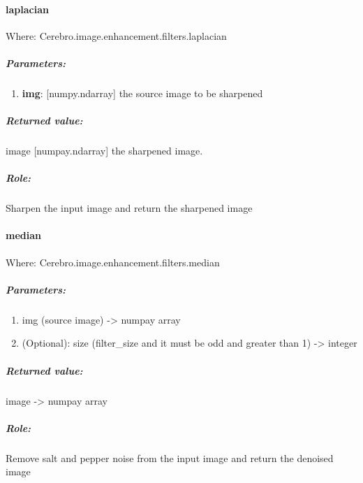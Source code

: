 \paragraph{laplacian}
Where: Cerebro.image.enhancement.filters.laplacian
\subparagraph{Parameters:}
\begin{changemargin}{0.5cm}{0cm}
\begin{enumerate} 
	\item \textbf{img}: [numpy.ndarray] the source image to be sharpened
\end{enumerate}
\end{changemargin}

\subparagraph{Returned value:}
\begin{changemargin}{1cm}{0cm}
	image [numpay.ndarray] the sharpened image.
\end{changemargin}

\subparagraph{Role:}
\begin{changemargin}{1cm}{0cm}
	Sharpen the input image and return the sharpened image
\end{changemargin}

\paragraph{median}
Where: Cerebro.image.enhancement.filters.median \newline
\subparagraph{Parameters:}
\begin{changemargin}{0.5cm}{0cm}
	\begin{enumerate}
		\item img (source image) -> numpay array \newline
		\item (Optional): size (filter\_size and it must be odd and greater than 1) -> integer \newline
	\end{enumerate}
\end{changemargin}

\subparagraph{Returned value:}
\begin{changemargin}{1cm}{0cm}
	image -> numpay array \newline
\end{changemargin}

\subparagraph{Role:}
\begin{changemargin}{1cm}{0cm}
 	Remove salt and pepper noise from the input image and return the denoised image
\end{changemargin}
 	
